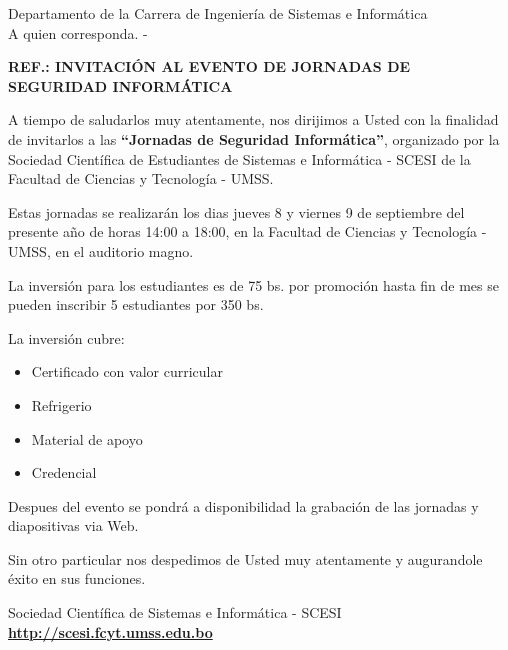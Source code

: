 \documentclass[letterpaper,12pt]{letter}
\begin{document}
\date {25 de agosto de 2011}

\begin{letter}{Departamento de la Carrera de Ingenier\'ia de Sistemas e Inform\'atica \\ A quien corresponda. -}

\begin{center}
	\opening{\textbf{REF.: INVITACI\'ON AL EVENTO DE JORNADAS DE SEGURIDAD INFORM\'ATICA}}
\end{center}

A tiempo de saludarlos muy atentamente, nos dirijimos a Usted con la finalidad de invitarlos a las 
{\bfseries ``Jornadas de Seguridad Inform\'atica''}, organizado por la Sociedad Cient\'ifica de Estudiantes de 
Sistemas e Inform\'atica - SCESI de la Facultad de Ciencias y Tecnolog\'ia - UMSS.

Estas jornadas se realizar\'an los dias jueves 8 y viernes 9 de septiembre del presente a\~no de horas 14:00 a 
18:00, en la Facultad de Ciencias y Tecnolog\'ia - UMSS, en el auditorio magno.

La inversi\'on para los estudiantes es de 75 bs. por promoci\'on hasta fin de mes se pueden inscribir 5 estudiantes por 
350 bs.

La inversi\'on cubre:
\begin{itemize}
    \item Certificado con valor curricular
    \item Refrigerio
    \item Material de apoyo
    \item Credencial
\end{itemize}

Despues del evento se pondr\'a a disponibilidad la grabaci\'on de las jornadas y diapositivas via Web.

Sin otro particular nos despedimos de Usted muy atentamente y augurandole \'exito en sus funciones.\\

\vspace{3cm}

\begin{center}
Sociedad Cient\'ifica de Sistemas e Inform\'atica - SCESI\\
{\bfseries \url {http://scesi.fcyt.umss.edu.bo}}
\end{center}

\end{letter}
\end{document}
